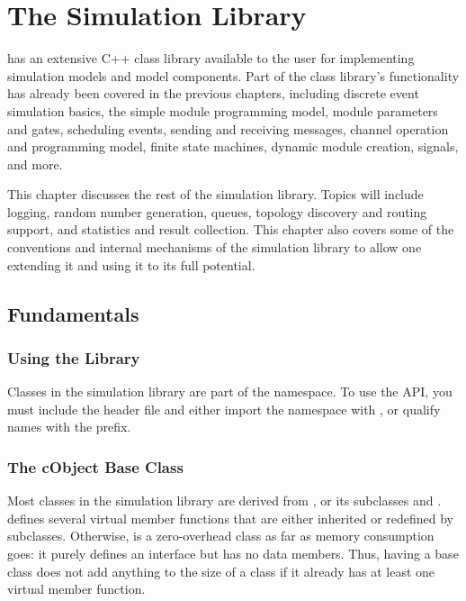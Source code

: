 \chapter{The Simulation Library}
\label{cha:sim-lib}

{\opp} has an extensive C++ class library available to the user for
implementing simulation models and model components. Part of the class
library's functionality has already been covered in the previous chapters,
including discrete event simulation basics, the simple module programming
model, module parameters and gates, scheduling events, sending and
receiving messages, channel operation and programming model, finite state
machines, dynamic module creation, signals, and more.

This chapter discusses the rest of the simulation library. Topics will
include logging, random number generation, queues, topology discovery and
routing support, and statistics and result collection. This chapter also
covers some of the conventions and internal mechanisms of the simulation
library to allow one extending it and using it to its full potential.


\section{Fundamentals}
\label{sec:sim-lib:fundamentals}

\subsection{Using the Library}
\label{sec:sim-lib:using-omnetpp-library}

Classes in the {\opp} simulation library are part of the 
namespace. To use the {\opp} API, you must include the 
header file and either import the namespace with , or qualify names with the  prefix.

\subsection{The cObject Base Class}
\label{sec:sim-lib:cobject}

Most classes in the simulation library are derived from ,
or its subclasses  and .
 defines several virtual member functions that are either
inherited or redefined by subclasses. Otherwise,  is a
zero-overhead class as far as memory consumption goes: it purely defines an
interface but has no data members. Thus, having  a base
class does not add anything to the size of a class if it already has at
least one virtual member function.

